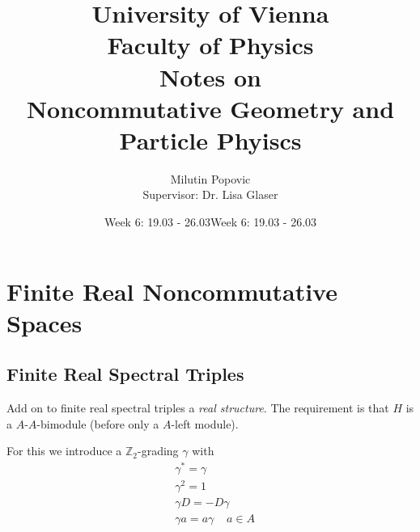 \documentclass[a4paper]{article}
\date{Week 6: 19.03 - 26.03}
\title{University of Vienna\\ Faculty of Physics\\ \vspace{1.25cm}
Notes on\\ Noncommutative Geometry and Particle Phyiscs}
\author{Milutin Popovic \\ Supervisor: Dr. Lisa
Glaser}
\date{Week 6: 19.03 - 26.03}
\theoremstyle{definition}
\theoremstyle{definition}
\theoremstyle{definition}
\theoremstyle{theorem}
\theoremstyle{theorem}
\begin{document}
    \maketitle
    \tableofcontents
    \newpage
\section{Finite Real Noncommutative Spaces}
\subsection{Finite Real Spectral Triples}
Add on to finite real spectral triples a \textit{real structure}. The
requirement is that $H$ is a $A$-$A$-bimodule (before only a $A$-left
module).
\newline

For this we introduce a $\mathbb{Z}_2$-grading $\gamma$ with
\begin{align}
    &\gamma ^* = \gamma \\
    &\gamma ^2 = 1 \\
    &\gamma D = - D \gamma\\
    &\gamma a = a \gamma \;\;\;\; a\in A
\end{align}
\end{document}
